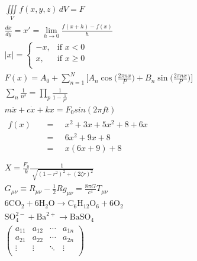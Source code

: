 \documentclass{article}  %
\begin{document}
\pagestyle{empty}		%
\begin{gather*}		%
\iiint\limits_V f(x,y,z) \,dV = F\\[0.15cm] %
\frac{dx}{dy} = x' = \lim\limits_{h \to 0} \frac{f(x+h) - f(x)}{h}\\[0.3cm]		%
|x|=
\begin{cases}		%
-x, & \text{if } x < 0\\
x, & \text{if } x \geq 0\\
\end{cases}\\[0.15cm]
F(x) = A_0 + \sum_{n=1}^N\biggl[A_n\cos\biggl({\frac{2\pi nx}{P}}\biggr) + B_n\sin\biggl({\frac{2\pi nx}{P}}\biggr)\biggr]\\[0.25cm]
\sum_{n}\frac{1}{n^s} = \prod_p \frac{1}{1-\frac{1}{p^s}}\\[0.25cm]
m\ddot x + c\dot x + kx = F_0sin(2\pi ft)\\[0.3cm] %
\begin{split} 		%
f(x) \;\;\; &= \;\;\;\; x^2 + 3x + 5x^2 + 8 + 6x\\
\;\;\; &= \;\;\;\; 6x^2 + 9x + 8\\
\;\;\; &= \;\;\;\; x(6x+9) + 8\\[0.25cm]
\end{split}\\[0.15cm]
X = \frac{F_0}{k}\frac{1}{\sqrt[]{(1-r^2)^2 + (2\zeta r)^2}}\\[0.5cm]	%
G_{\mu\nu} \equiv R_{\mu\nu} - \frac{1}{2}Rg_{\mu\nu} = \frac{8\pi G}{c^4}T_{\mu\nu}\\[0.35cm]	%
\text{6CO}_2 + \text{6H}_2\text{O} \to \text{C}_6\text{H}_{12}\text{O}_\text{6} + \text{6O}_2\\[0.3cm]
\text{SO}_4^{2-} + \text{Ba}^{2+} \to \text{BaSO}_4\\[0.3cm]
\begin{pmatrix}			%
a_{11} & a_{12} & \cdots & a_{1n} \\
a_{21} & a_{22} & \cdots & a_{2n} \\
\vdots & \vdots & \ddots & \vdots \\

\end{pmatrix}
\end{gather*}
\end{document}
